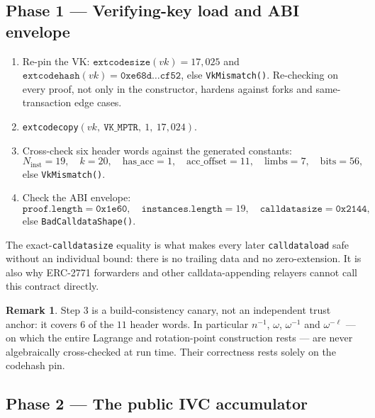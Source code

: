 \documentclass[11pt,a4paper]{article}
\newcommand{\code}[1]{\texttt{#1}}
\newcommand{\err}[1]{\textcolor{red!60!black}{\texttt{#1}}}
\newcommand{\mptr}[1]{\texttt{#1}}
\theoremstyle{definition}
\newtheorem{remark}{Remark}[section]
\begin{document}
\subsection{Phase 1 --- Verifying-key load and ABI envelope}
\label{sec:vkload}

\begin{enumerate}[label=\arabic*.,leftmargin=1cm]
\item Re-pin the VK: $\code{extcodesize}(vk)=17{,}025$ and $\code{extcodehash}(vk)=\mathtt{0xe68d\ldots cf52}$, else
      \err{VkMismatch()}. Re-checking on every proof, not only in the
      constructor, hardens against forks and same-transaction edge cases.
\item \code{extcodecopy}$(vk,\ \mptr{VK\_MPTR},\ 1,\ 17{,}024)$.
\item Cross-check six header words against the generated constants:
      \[
      N_{\mathrm{inst}}=19,\quad k=20,\quad \mathrm{has\_acc}=1,\quad
      \mathrm{acc\_offset}=11,\quad \mathrm{limbs}=7,\quad \mathrm{bits}=56,
      \]
      else \err{VkMismatch()}.
\item Check the ABI envelope:
      \[
      \code{proof.length}=\mathtt{0x1e60},\quad
      \code{instances.length}=19,\quad
      \code{calldatasize}=\mathtt{0x2144},
      \]
      else \err{BadCalldataShape()}.
\end{enumerate}

The exact-\code{calldatasize} equality is what makes every later
\code{calldataload} safe without an individual bound: there is no trailing data
and no zero-extension. It is also why ERC-2771 forwarders and other
calldata-appending relayers cannot call this contract directly.

\begin{remark}
Step 3 is a build-consistency canary, not an independent trust anchor: it
covers $6$ of the $11$ header words. In particular $n^{-1}$, $\omega$,
$\omega^{-1}$ and $\omega^{-\ell}$ --- on which the entire Lagrange and
rotation-point construction rests --- are never algebraically cross-checked at
run time. Their correctness rests solely on the codehash pin.
\end{remark}

\subsection{Phase 2 --- The public IVC accumulator}
\label{sec:acc}
\end{document}
